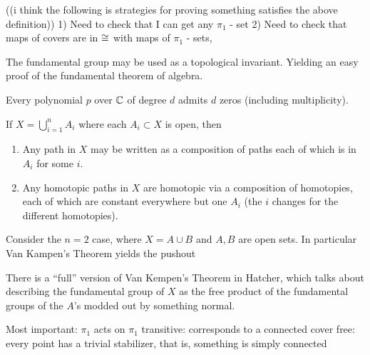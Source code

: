 \documentclass[11pt,leqno,oneside]{amsart}
\newenvironment{dateenv}{
  \vspace{1em}
}{
  \vspace{1em}
}
\newcommand{\mydate}[4]{
  \newdate{#1}{#2}{#3}{#4}
  \begin{dateenv}
    \hfill\displaydate{#1}
  \end{dateenv}
}
\numberwithin{thm}{section}
\newcommand{\fund}[1][1]{\pi_{#1}}
\begin{document}
((i think the following is strategies for proving something satisfies the above definition))
1) Need to check that I can get any $\fund$ - set
2) Need to check that maps of covers are in $\mathrel{\cong}$ with maps of $\fund$ - sets,


\mydate{d5}{1}{2}{2017}

The fundamental group may be used as a topological invariant. Yielding
an easy proof of the fundamental theorem of algebra.

\begin{thm}
  Every polynomial \(p\) over \({\mathbb C}\) of degree \(d\) admits \(d\)
  zeros (including multiplicity).
\end{thm}

\begin{thm}
  If \(X= \bigcup_{i=1}^n {A_i}\) where each \(A_i \subset X\) is open, then
  \begin{enumerate}[label=(\alph*)]
    \item Any path in \(X\) may be written as a composition of paths
      each of which is in \(A_i\) for some \(i\).
    \item Any homotopic paths in \(X\) are homotopic via a composition
      of homotopies, each of which are constant everywhere but one
      \(A_i\) (the \(i\) changes for the different homotopies).
  \end{enumerate}
\end{thm}

Consider the $n=2$ case, where \(X=A \cup B\) and \(A,B\) are open sets. In particular Van Kampen's Theorem yields the pushout

\begin{rmk}
  There is a ``full'' version of Van Kempen's Theorem in Hatcher, which talks about describing the fundamental group of $X$ as the free product of the fundamental groups of the $A$'s modded out by something normal.
\end{rmk}

\begin{center}
\end{center}

Most important:
$\fund$ acts on $\fund$
transitive: corresponds to a connected cover
free: every point has a trivial stabilizer, that is, something is simply connected
\end{document}
